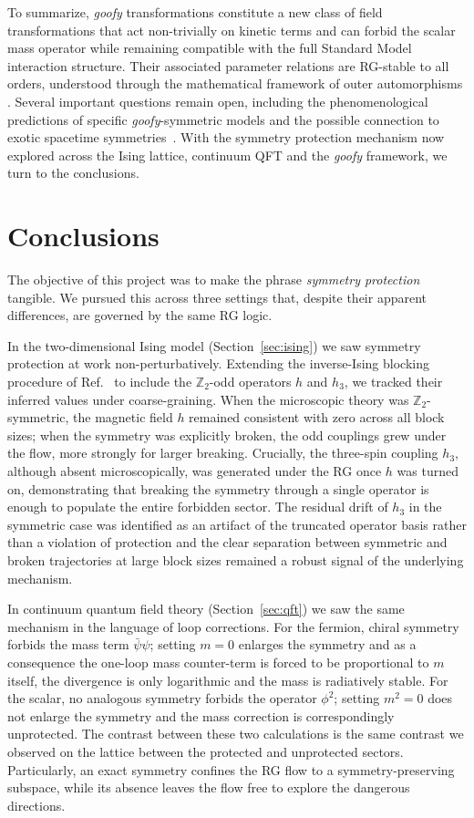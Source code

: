 \documentclass[a4paper, 11pt]{article}
\begin{document}
To summarize, \textit{goofy} transformations constitute a new class of field transformations that act non-trivially on kinetic terms and can forbid the scalar mass operator while remaining compatible with the full Standard Model interaction structure. Their associated parameter relations are RG-stable to all orders, understood through the mathematical framework of outer automorphisms \cite{deBoer_Trautner_Outs}. Several important questions remain open, including the phenomenological predictions of specific \textit{goofy}-symmetric models and the possible connection to exotic spacetime symmetries~\cite{Trautner_goofy1,goofy2,deBoer_Trautner_Outs}. With the symmetry protection mechanism now explored across the Ising lattice, continuum QFT and the \textit{goofy} framework, we turn to the conclusions.

\section{Conclusions}
\label{sec:conclusions}

The objective of this project was to make the phrase \emph{symmetry protection} tangible. We pursued this across three settings that, despite their apparent differences, are governed by the same RG logic.

In the two-dimensional Ising model (Section~\ref{sec:ising}) we saw symmetry protection at work non-perturbatively. Extending the inverse-Ising blocking procedure of Ref.~\cite{blocking} to include the $\mathbb{Z}_2$-odd operators $h$ and $h_3$, we tracked their inferred values under coarse-graining. When the microscopic theory was $\mathbb{Z}_2$-symmetric, the magnetic field $h$ remained consistent with zero across all block sizes; when the symmetry was explicitly broken, the odd couplings grew under the flow, more strongly for larger breaking. Crucially, the three-spin coupling $h_3$, although absent microscopically, was generated under the RG once $h$ was turned on, demonstrating that breaking the symmetry through a single operator is enough to populate the entire forbidden sector. The residual drift of $h_3$ in the symmetric case was identified as an artifact of the truncated operator basis rather than a violation of protection and the clear separation between symmetric and broken trajectories at large block sizes remained a robust signal of the underlying mechanism.

In continuum quantum field theory (Section~\ref{sec:qft}) we saw the same mechanism in the language of loop corrections. For the fermion, chiral symmetry forbids the mass term $\bar{\psi}\psi$; setting $m=0$ enlarges the symmetry and as a consequence the one-loop mass counter-term is forced to be proportional to $m$ itself, the divergence is only logarithmic and the mass is radiatively stable. For the scalar, no analogous symmetry forbids the operator $\phi^2$; setting $m^2 = 0$ does not enlarge the symmetry and the mass correction is correspondingly unprotected. The contrast between these two calculations is the same contrast we observed on the lattice between the protected and unprotected sectors. Particularly, an exact symmetry confines the RG flow to a symmetry-preserving subspace, while its absence leaves the flow free to explore the dangerous directions.
\end{document}
